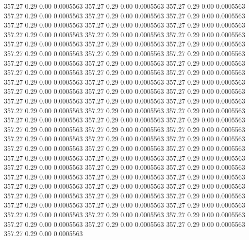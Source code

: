  357.27    0.29    0.00   0.0005563
 357.27    0.29    0.00   0.0005563
 357.27    0.29    0.00   0.0005563
 357.27    0.29    0.00   0.0005563
 357.27    0.29    0.00   0.0005563
 357.27    0.29    0.00   0.0005563
 357.27    0.29    0.00   0.0005563
 357.27    0.29    0.00   0.0005563
 357.27    0.29    0.00   0.0005563
 357.27    0.29    0.00   0.0005563
 357.27    0.29    0.00   0.0005563
 357.27    0.29    0.00   0.0005563
 357.27    0.29    0.00   0.0005563
 357.27    0.29    0.00   0.0005563
 357.27    0.29    0.00   0.0005563
 357.27    0.29    0.00   0.0005563
 357.27    0.29    0.00   0.0005563
 357.27    0.29    0.00   0.0005563
 357.27    0.29    0.00   0.0005563
 357.27    0.29    0.00   0.0005563
 357.27    0.29    0.00   0.0005563
 357.27    0.29    0.00   0.0005563
 357.27    0.29    0.00   0.0005563
 357.27    0.29    0.00   0.0005563
 357.27    0.29    0.00   0.0005563
 357.27    0.29    0.00   0.0005563
 357.27    0.29    0.00   0.0005563
 357.27    0.29    0.00   0.0005563
 357.27    0.29    0.00   0.0005563
 357.27    0.29    0.00   0.0005563
 357.27    0.29    0.00   0.0005563
 357.27    0.29    0.00   0.0005563
 357.27    0.29    0.00   0.0005563
 357.27    0.29    0.00   0.0005563
 357.27    0.29    0.00   0.0005563
 357.27    0.29    0.00   0.0005563
 357.27    0.29    0.00   0.0005563
 357.27    0.29    0.00   0.0005563
 357.27    0.29    0.00   0.0005563
 357.27    0.29    0.00   0.0005563
 357.27    0.29    0.00   0.0005563
 357.27    0.29    0.00   0.0005563
 357.27    0.29    0.00   0.0005563
 357.27    0.29    0.00   0.0005563
 357.27    0.29    0.00   0.0005563
 357.27    0.29    0.00   0.0005563
 357.27    0.29    0.00   0.0005563
 357.27    0.29    0.00   0.0005563
 357.27    0.29    0.00   0.0005563
 357.27    0.29    0.00   0.0005563
 357.27    0.29    0.00   0.0005563
 357.27    0.29    0.00   0.0005563
 357.27    0.29    0.00   0.0005563
 357.27    0.29    0.00   0.0005563
 357.27    0.29    0.00   0.0005563
 357.27    0.29    0.00   0.0005563
 357.27    0.29    0.00   0.0005563
 357.27    0.29    0.00   0.0005563
 357.27    0.29    0.00   0.0005563
 357.27    0.29    0.00   0.0005563
 357.27    0.29    0.00   0.0005563
 357.27    0.29    0.00   0.0005563
 357.27    0.29    0.00   0.0005563
 357.27    0.29    0.00   0.0005563
 357.27    0.29    0.00   0.0005563
 357.27    0.29    0.00   0.0005563
 357.27    0.29    0.00   0.0005563
 357.27    0.29    0.00   0.0005563
 357.27    0.29    0.00   0.0005563
 357.27    0.29    0.00   0.0005563
 357.27    0.29    0.00   0.0005563
 357.27    0.29    0.00   0.0005563
 357.27    0.29    0.00   0.0005563
